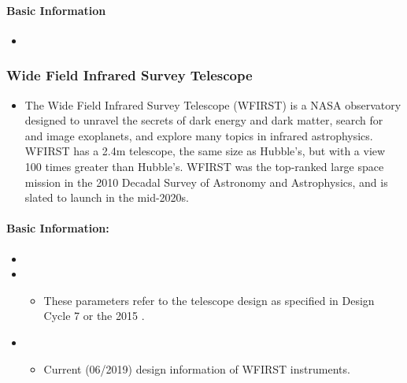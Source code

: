 \documentclass[letterpaper,10pt,english]{sphinxmanual}
\begin{document}
\paragraph{Basic Information}
\label{\detokenize{resource/astro/projects/euclid:basic-information}}\begin{itemize}
\item {} 

\end{itemize}


\subsubsection{Wide Field Infrared Survey Telescope}
\label{\detokenize{resource/astro/projects/wfirst:wide-field-infrared-survey-telescope}}\label{\detokenize{resource/astro/projects/wfirst::doc}}\begin{itemize}
\item {} 
The Wide Field Infrared Survey Telescope (WFIRST) is a NASA
observatory designed to unravel the secrets of dark energy and dark
matter, search for and image exoplanets, and explore many topics in
infrared astrophysics. WFIRST has a 2.4m telescope, the same size as
Hubble’s, but with a view 100 times greater than Hubble’s. WFIRST was
the top-ranked large space mission in the 2010 Decadal Survey of
Astronomy and Astrophysics, and is slated to launch in the mid-2020s.

\end{itemize}


\paragraph{Basic Information:}
\label{\detokenize{resource/astro/projects/wfirst:basic-information}}\begin{itemize}
\item {} 

\item {} 
\begin{itemize}
\item {} 
These parameters refer to the telescope design as specified in
Design Cycle 7 or the 2015 .

\end{itemize}

\item {} 
\begin{itemize}
\item {} 
Current (06/2019) design information of WFIRST instruments.

\end{itemize}

\end{itemize}
\end{document}
